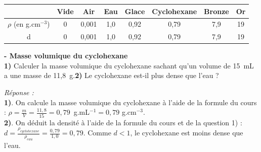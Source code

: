 \begin{tabular}{|c|C{0.06}|C{0.06}|C{0.06}|C{0.1}|C{0.15}|C{0.1}|C{0.1}|}
   \hline
     & Vide & Air & Eau & Glace & Cyclohexane & Bronze & Or \\
    \hline
    $\rho$ (en g.cm$^{-3}$) & 0 & 0,001 & 1,0 & 0,92 & 0,79 & 7,9 & 19  \\
    \hline
    d & 0 & 0,001 & 1,0 & 0,92 & 0,79 & 7,9 & 19 \\
    \hline
    \end{tabular}
\begin{mdframed}[style=autreexo]
\textbf{ - Masse volumique du cyclohexane}\\
\textbf{1)} Calculer la masse volumique du cyclohexane sachant qu'un volume de 15~mL a une masse de 11,8~g.\newline \textbf{2)} Le cyclohexane est-il plus dense que l'eau ? \end{mdframed}
\textit{Réponse :} \\
\textbf{1)}. On calcule la masse volumique du cyclohexane à l'aide de la formule du cours : $\rho=\frac{m}{V} = \frac{11,8}{15}=0,79$~g.mL$^{-1}=0,79$ g.cm$^{-3}$.\\
\textbf{2)}. On déduit la densité à l'aide de la formule du cours et de la question 1) : $d=\frac{\rho_{cyclohexane}}{\rho_{eau}}=\frac{0,79}{1,0}=0,79$. Comme $d<1$, le cyclohexane est moins dense que l'eau. 
\newpage

